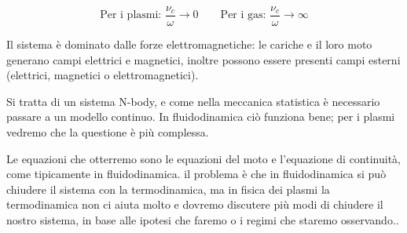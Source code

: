 \[
\text{Per i plasmi: } \frac{\nu_c}{\omega} \rightarrow 0 \quad\quad
\text{Per i gas: } \frac{\nu_c}{\omega} \rightarrow \infty
\]

Il sistema è dominato dalle forze elettromagnetiche: le cariche e il loro moto generano campi elettrici e magnetici, inoltre possono essere presenti campi esterni (elettrici, magnetici o elettromagnetici). 

Si tratta di un sistema N-body, e come nella meccanica statistica è necessario passare a un modello continuo. In fluidodinamica ciò funziona bene; per i plasmi vedremo che la questione è più complessa.


Le equazioni che otterremo sono le equazioni del moto  e l'equazione di continuità, come tipicamente in fluidodinamica. il problema è che in fluidodinamica si può chiudere il sistema con la termodinamica, ma in fisica dei plasmi la termodinamica non ci aiuta molto e dovremo discutere più modi di chiudere il nostro sistema, in base alle ipotesi che faremo o i regimi che staremo osservando..
